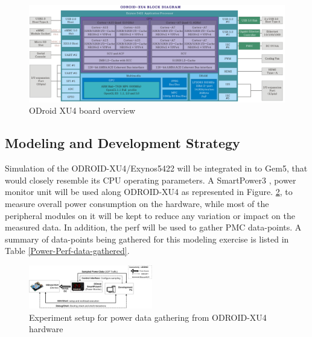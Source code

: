 \documentclass[conference]{IEEEtran}
\begin{document}
    \begin{figure}[bh]
        \includegraphics{rsrc/201506191222574523.png}
        \caption{ODroid XU4 board overview}
        \label{fig-odroid-hwoverview}
    \end{figure}

    \subsection{Modeling and Development Strategy}
        \par Simulation of the ODROID-XU4/Exynos5422 will be integrated in to Gem5, that would closely resemble its CPU operating parameters. A SmartPower3 \cite{odroid-smartpower3}, power monitor unit will be used along ODROID-XU4 as represented in Figure. \ref{fig-Experiment-setup}, to measure overall power consumption on the hardware, while most of the peripheral modules on it will be kept to reduce any variation or impact on the measured data. In addition, the perf\cite{2015137} will be used to gather PMC data-points. A summary of data-points being gathered for this modeling exercise is listed in Table \ref{Power-Perf-data-gathered}.

        \begin{figure}[t]
            \centering
            \includegraphics[width=0.48\textwidth]{rsrc/Experiment-setup.drawio.png}
            \caption{Experiment setup for power data gathering from ODROID-XU4\cite{odroid-xu4} hardware}
            \label{fig-Experiment-setup}
        \end{figure}
\end{document}
